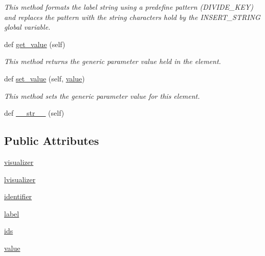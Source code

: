 \begin{DoxyCompactItemize}
\begin{DoxyCompactList}\small\item\em This method formats the label string using a predefine pattern (D\+I\+V\+I\+D\+E\+\_\+\+K\+E\+Y) and replaces the pattern with the string characters hold by the I\+N\+S\+E\+R\+T\+\_\+\+S\+T\+R\+I\+N\+G global variable. \end{DoxyCompactList}\item 
def \hyperlink{classbridges_1_1element_1_1_element_aafcdc6c1661ddbf28e664b69c72ed5a4}{get\+\_\+value} (self)
\begin{DoxyCompactList}\small\item\em This method returns the generic parameter value held in the element. \end{DoxyCompactList}\item 
def \hyperlink{classbridges_1_1element_1_1_element_a609e3d9fc11194f70f4b053ffe19ea62}{set\+\_\+value} (self, \hyperlink{classbridges_1_1element_1_1_element_a4ea3c6d8ba6395dc681e337074f098aa}{value})
\begin{DoxyCompactList}\small\item\em This method sets the generic parameter value for this element. \end{DoxyCompactList}\item 
def \hyperlink{classbridges_1_1element_1_1_element_a92a94c7f36d8cfb5db5435013556519a}{\+\_\+\+\_\+str\+\_\+\+\_\+} (self)
\end{DoxyCompactItemize}
\subsection*{Public Attributes}
\begin{DoxyCompactItemize}
\item 
\hyperlink{classbridges_1_1element_1_1_element_a86b560e1c213852ad2e99131f0f1e914}{visualizer}
\item 
\hyperlink{classbridges_1_1element_1_1_element_ab508420710407f845954c8a5a8f2fdca}{lvisualizer}
\item 
\hyperlink{classbridges_1_1element_1_1_element_ae36d462231f6e7b1afbde7262367da57}{identifier}
\item 
\hyperlink{classbridges_1_1element_1_1_element_a97551dbb005cd5d1f13b65461290c6e3}{label}
\item 
\hyperlink{classbridges_1_1element_1_1_element_a5e11b599ba51ac5c4647195677bd659c}{ids}
\item 
\hyperlink{classbridges_1_1element_1_1_element_ab0f332022d1ded0b9cd2989bc7a22765}{value}
\end{DoxyCompactItemize}
